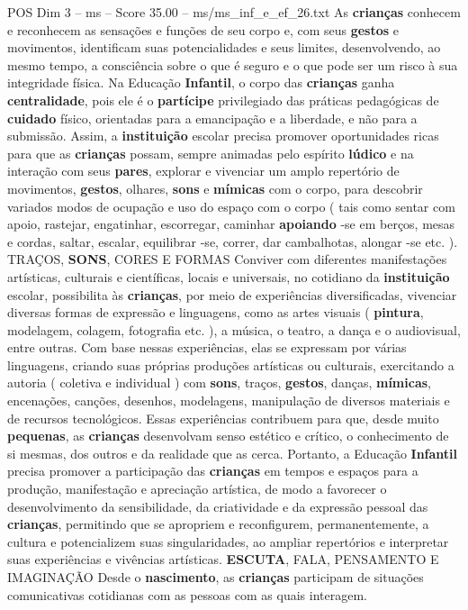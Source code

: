 \begin{textsample}{POS Dim 3 – ms – Score 35.00 – ms/ms\_inf\_e\_ef\_26.txt}
As \textbf{crianças} conhecem e reconhecem as sensações e funções de seu corpo e, com seus \textbf{gestos} e movimentos, identificam suas potencialidades e seus limites, desenvolvendo, ao mesmo tempo, a consciência sobre o que é seguro e o que pode ser um risco à sua integridade física.
Na Educação \textbf{Infantil}, o corpo das \textbf{crianças} ganha \textbf{centralidade}, pois ele é o \textbf{partícipe} privilegiado das práticas pedagógicas de \textbf{cuidado} físico, orientadas para a emancipação e a liberdade, e não para a submissão.
Assim, a \textbf{instituição} escolar precisa promover oportunidades ricas para que as \textbf{crianças} possam, sempre animadas pelo espírito \textbf{lúdico} e na interação com seus \textbf{pares}, explorar e vivenciar um amplo repertório de movimentos, \textbf{gestos}, olhares, \textbf{sons} e \textbf{mímicas} com o corpo, para descobrir variados modos de ocupação e uso do espaço com o corpo ( tais como sentar com apoio, rastejar, engatinhar, escorregar, caminhar \textbf{apoiando} -se em berços, mesas e cordas, saltar, escalar, equilibrar -se, correr, dar cambalhotas, alongar -se etc. ).
TRAÇOS, \textbf{SONS}, CORES E FORMAS Conviver com diferentes manifestações artísticas, culturais e científicas, locais e universais, no cotidiano da \textbf{instituição} escolar, possibilita às \textbf{crianças}, por meio de experiências diversificadas, vivenciar diversas formas de expressão e linguagens, como as artes visuais ( \textbf{pintura}, modelagem, colagem, fotografia etc. ), a música, o teatro, a dança e o audiovisual, entre outras.
Com base nessas experiências, elas se expressam por várias linguagens, criando suas próprias produções artísticas ou culturais, exercitando a autoria ( coletiva e individual ) com \textbf{sons}, traços, \textbf{gestos}, danças, \textbf{mímicas}, encenações, canções, desenhos, modelagens, manipulação de diversos materiais e de recursos tecnológicos.
Essas experiências contribuem para que, desde muito \textbf{pequenas}, as \textbf{crianças} desenvolvam senso estético e crítico, o conhecimento de si mesmas, dos outros e da realidade que as cerca.
Portanto, a Educação \textbf{Infantil} precisa promover a participação das \textbf{crianças} em tempos e espaços para a produção, manifestação e apreciação artística, de modo a favorecer o desenvolvimento da sensibilidade, da criatividade e da expressão pessoal das \textbf{crianças}, permitindo que se apropriem e reconfigurem, permanentemente, a cultura e potencializem suas singularidades, ao ampliar repertórios e interpretar suas experiências e vivências artísticas. \textbf{ESCUTA}, FALA, PENSAMENTO E IMAGINAÇÃO Desde o \textbf{nascimento}, as \textbf{crianças} participam de situações comunicativas cotidianas com as pessoas com as quais interagem.

\end{textsample}
